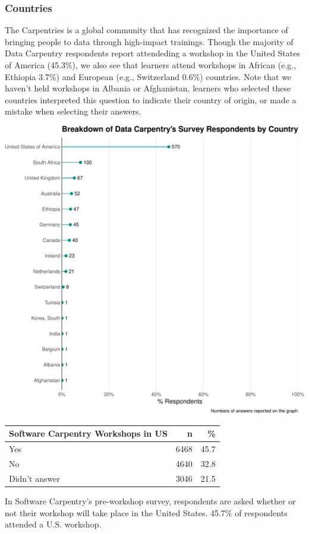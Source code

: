 \documentclass[]{article}
\makeatletter
\def\maxwidth{\ifdim\Gin@nat@width>\linewidth\linewidth\else\Gin@nat@width\fi}
\makeatother
\begin{document}
\subsubsection{Countries}\label{countries}

The Carpentries is a global community that has recognized the importance
of bringing people to data through high-impact trainings. Though the
majority of Data Carpentry respondents report attendeding a workshop in
the United States of America (45.3\%), we also see that learners attend
workshops in African (e.g., Ethiopia 3.7\%) and European (e.g.,
Switzerland 0.6\%) countries. Note that we haven't held workshops in
Albania or Afghanistan, learners who selected these countries
interpreted this question to indicate their country of origin, or made a
mistake when selecting their answers.

\includegraphics[width=\maxwidth]{../figures/dc-country-workshop-plot-1}

\begin{longtable}[]{@{}lrr@{}}
\toprule
Software Carpentry Workshops in US & n & \%\tabularnewline
\midrule
\endhead
Yes & 6468 & 45.7\tabularnewline
No & 4640 & 32.8\tabularnewline
Didn't answer & 3046 & 21.5\tabularnewline
\bottomrule
\end{longtable}

In Software Carpentry's pre-workshop survey, respondents are asked
whether or not their workshop will take place in the United States.
45.7\% of respondents attended a U.S. workshop.
\end{document}
